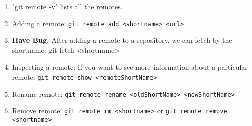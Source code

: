 \documentclass[10 pt]{article}
\begin{document}
\begin{enumerate}
	\item "git remote -v" lists all the remotes.
	\item Adding a remote: \texttt{git remote add <shortname> <url>}
	\item \textbf{Have Bug}, After adding a remote to a repository, we can fetch by the shortname: git fetch <shortname>
	\item Inspecting a remote: If you want to see more information about a particular remote: \texttt{git remote show <remoteShortName>}
	\item Rename remote: \texttt{git remote rename <oldShortName> <newShortName>}
	\item Remove remote: \texttt{git remote rm <shortname>} or \texttt{git remote remove <shortname>}
\end{enumerate}
\end{document}

